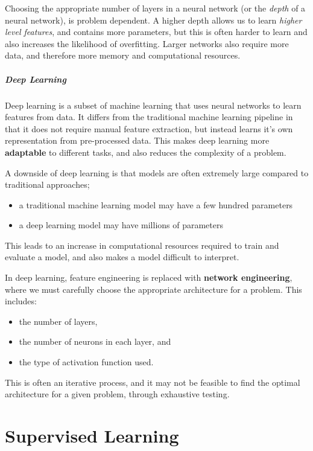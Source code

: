 \documentclass{article}
\begin{document}
Choosing the appropriate number of layers in a neural network (or the
\textit{depth} of a neural network), is problem dependent. A higher
depth allows us to learn \textit{higher level features}, and contains
more parameters, but this is often harder to learn and also increases
the likelihood of overfitting. Larger networks also require more data,
and therefore more memory and computational resources.
\subsubsection{Deep Learning}
Deep learning is a subset of machine learning that uses neural networks
to learn features from data. It differs from the traditional machine
learning pipeline in that it does not require manual feature
extraction, but instead learns it's own representation from
pre-processed data. This makes deep learning more \textbf{adaptable} to
different tasks, and also reduces the complexity of a problem.

A downside of deep learning is that models are often extremely large
compared to traditional approaches;
\begin{itemize}
    \item a traditional machine learning model may have a few hundred
          parameters
    \item a deep learning model may have millions of parameters
\end{itemize}
This leads to an increase in computational resources required to train
and evaluate a model, and also makes a model difficult to interpret.

In deep learning, feature engineering is replaced with \textbf{network
engineering}, where we must carefully choose the appropriate
architecture for a problem. This includes:
\begin{itemize}
    \item the number of layers,
    \item the number of neurons in each layer, and
    \item the type of activation function used.
\end{itemize}
This is often an iterative process, and it may not be feasible to find
the optimal architecture for a given problem, through exhaustive
testing.
\part{Supervised Learning}
\end{document}
